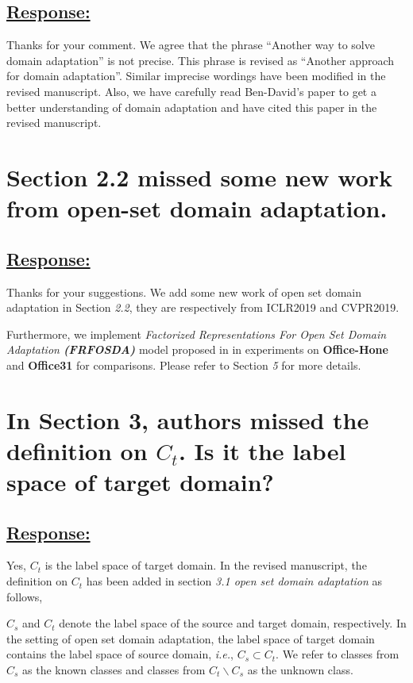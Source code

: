 \subsection*{\underline{\textbf{Response:}}}
Thanks for your comment.
We agree that the phrase ``Another way to solve domain adaptation'' is not precise.
This phrase is revised as ``Another approach for domain adaptation''.
Similar imprecise wordings have been modified in the revised manuscript.
Also, we have carefully read Ben-David's paper \cite{ben2010theory} to get a better understanding of domain adaptation and have cited this paper in the revised manuscript.


\section{Section 2.2 missed some new work from open-set domain adaptation.}
\subsection*{\underline{\textbf{Response:}}}
Thanks for your suggestions.
We add some new work \cite{PDA-fac,PDA-sep} of open set domain adaptation in Section \textit{2.2}, they are respectively from ICLR2019 and CVPR2019.

Furthermore, we implement \textit{Factorized Representations For Open Set Domain Adaptation \textbf{(FRFOSDA)}} model proposed in \cite{PDA-fac} in experiments on \textbf{Office-Hone} and \textbf{Office31} for comparisons.
Please refer to Section \textit{5} for more details.

\section{In Section 3, authors missed the definition on $C_t$. Is it the label space of target domain?}
\subsection*{\underline{\textbf{Response:}}}
Yes, $C_t$ is the label space of target domain.
In the revised manuscript, the definition on $C_t$ has been added in section \textit{3.1 open set domain adaptation} as follows,
\begin{siderules}
\small
$C_s$ and $C_t$ denote the label space of the source and target domain, respectively.
In the setting of open set domain adaptation, the label space of target domain contains the label space of source domain, \textit{i.e.}, $C_s \subset C_t$.
We refer to classes from $C_s$ as the known classes and classes from $C_t\backslash C_s$ as the unknown class.
\end{siderules}


